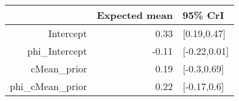 \begin{tabular}{rrl}
  \hline
 & Expected mean & 95\% CrI \\ 
  \hline
Intercept & 0.33 & [0.19,0.47] \\ 
  phi\_Intercept & -0.11 & [-0.22,0.01] \\ 
  cMean\_prior & 0.19 & [-0.3,0.69] \\ 
  phi\_cMean\_prior & 0.22 & [-0.17,0.6] \\ 
   \hline
\end{tabular}

